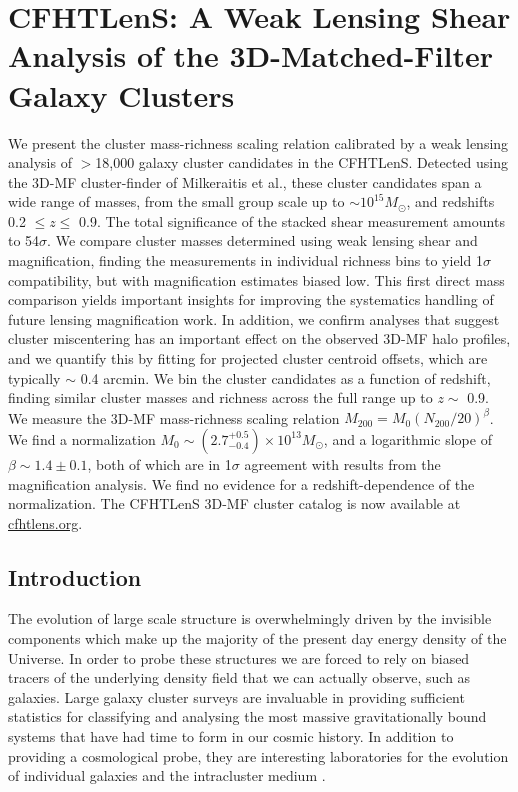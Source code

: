 \chapter{CFHTLenS: A Weak Lensing Shear Analysis of the 3D-Matched-Filter Galaxy Clusters}
\label{ch4}

We present the cluster mass-richness scaling relation calibrated by a weak lensing analysis of $>$18,000 galaxy cluster candidates in the \acf{CFHTLenS}. Detected using the \acf{3D-MF} cluster-finder of Milkeraitis et al., these cluster candidates span a wide range of masses, from the small group scale up to $\sim10^{15} M_{\odot}$, and redshifts 0.2 $\leq z\leq$ 0.9. The total significance of the stacked shear measurement amounts to 54$\sigma$. We compare cluster masses determined using weak lensing shear and magnification, finding the measurements in individual richness bins to yield 1$\sigma$ compatibility, but with magnification estimates biased low. This first direct mass comparison yields important insights for improving the systematics handling of future lensing magnification work. In addition, we confirm analyses that suggest cluster miscentering has an important effect on the observed \ac{3D-MF} halo profiles, and we quantify this by fitting for projected cluster centroid offsets, which are typically $\sim$ 0.4 arcmin. We bin the cluster candidates as a function of redshift, finding similar cluster masses and richness across the full range up to $z \sim$ 0.9. We measure the \ac{3D-MF} mass-richness scaling relation $M_{200 } = M_0 (N_{200} / 20)^\beta$. We find a normalization $M_0 \sim (2.7^{+0.5}_{-0.4}) \times 10^{13} M_{\odot}$, and a logarithmic slope of $\beta \sim 1.4 \pm 0.1$, both of which are in 1$\sigma$ agreement with results from the magnification analysis. We find no evidence for a redshift-dependence of the normalization. The \ac{CFHTLenS} \ac{3D-MF} cluster catalog is now available at \url{cfhtlens.org}.



\section{Introduction}
\label{intro}
The evolution of large scale structure is overwhelmingly driven by the invisible components which make up the majority of the present day energy density of the Universe. In order to probe these structures we are forced to rely on biased tracers of the underlying density field that we can actually observe, such as galaxies. Large galaxy cluster surveys are invaluable in providing sufficient statistics for classifying and analysing the most massive gravitationally bound systems that have had time to form in our cosmic history. In addition to providing a cosmological probe, they are interesting laboratories for the evolution of individual galaxies and the intracluster medium \citep{Voit05}.

